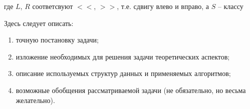  где $L$, $R$ соответсвуют $<<$, $>>$, т.е. сдвигу влево и вправо, а $S$ -- классу

Здесь следует описать:
\begin{enumerate}[1)]
\item точную постановку задачи;
\item изложение необходимых для решения задачи теоретических аспектов;
\item описание используемых структур данных и применяемых алгоритмов;
\item возможные обобщения рассматриваемой задачи (не обязательно, но
      весьма желательно).
\end{enumerate}
